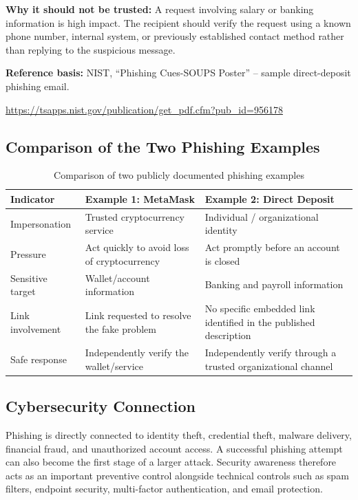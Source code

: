 \documentclass[12pt,a4paper]{article}
\newcommand{\referenceblock}[2]{%
\begin{samepage}
\noindent\textbf{Reference basis:} #1\par
\smallskip
\noindent\url{#2}\par
\end{samepage}
\par\vspace{0.25cm}
}
\begin{document}
\textbf{Why it should not be trusted:} A request involving salary or
banking information is high impact. The recipient should verify the
request using a known phone number, internal system, or previously
established contact method rather than replying to the suspicious
message.

\referenceblock{NIST, ``Phishing Cues-SOUPS Poster'' -- sample direct-deposit phishing email.}{https://tsapps.nist.gov/publication/get_pdf.cfm?pub_id=956178}

\subsection{Comparison of the Two Phishing Examples}

\begin{table}[H]
\centering
\small
\renewcommand{\arraystretch}{1.35}
\begin{tabular}{|p{3.0cm}|p{5.0cm}|p{5.0cm}|}
\hline
\textbf{Indicator} & \textbf{Example 1: MetaMask} & \textbf{Example 2: Direct Deposit}\\
\hline
Impersonation & Trusted cryptocurrency service & Individual / organizational identity\\
\hline
Pressure & Act quickly to avoid loss of cryptocurrency & Act promptly before an account is closed\\
\hline
Sensitive target & Wallet/account information & Banking and payroll information\\
\hline
Link involvement & Link requested to resolve the fake problem & No specific embedded link identified in the published description\\
\hline
Safe response & Independently verify the wallet/service & Independently verify through a trusted organizational channel\\
\hline
\end{tabular}
\caption{Comparison of two publicly documented phishing examples}
\label{tab:phishing-comparison}
\end{table}

\subsection{Cybersecurity Connection}

Phishing is directly connected to identity theft, credential theft,
malware delivery, financial fraud, and unauthorized account access.
A successful phishing attempt can also become the first stage of a
larger attack. Security awareness therefore acts as an important
preventive control alongside technical controls such as spam filters,
endpoint security, multi-factor authentication, and email protection.
\end{document}
